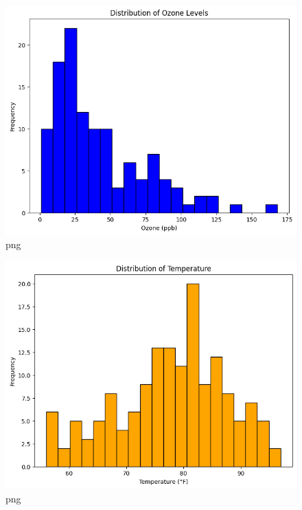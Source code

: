 \documentclass[
  letterpaper,
  DIV=11,
  numbers=noendperiod]{scrreprt}
\begin{document}
\begin{figure}[H]

{\centering \includegraphics{Tut2_Python_Olufawo_09_21_24_files/Tut2_Python_Olufawo_09_21_24_12_0.png}

}

\caption{png}

\end{figure}%
\begin{figure}[H]

{\centering \includegraphics{Tut2_Python_Olufawo_09_21_24_files/Tut2_Python_Olufawo_09_21_24_12_1.png}

}

\caption{png}

\end{figure}%
\end{document}
